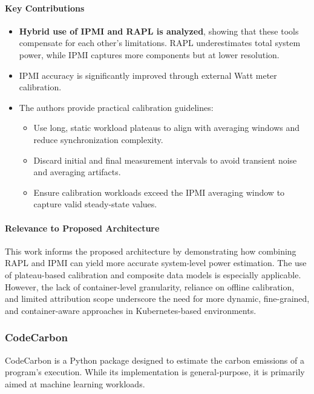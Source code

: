 \paragraph{Key Contributions}
\begin{itemize}
    \item \textbf{Hybrid use of IPMI and RAPL is analyzed}, showing that these tools compensate for each other’s limitations. RAPL underestimates total system power, while IPMI captures more components but at lower resolution.
    \item IPMI accuracy is significantly improved through external Watt meter calibration.
    \item The authors provide practical calibration guidelines:
    \begin{itemize}
        \item Use long, static workload plateaus to align with averaging windows and reduce synchronization complexity.
        \item Discard initial and final measurement intervals to avoid transient noise and averaging artifacts.
        \item Ensure calibration workloads exceed the IPMI averaging window to capture valid steady-state values.
    \end{itemize}
\end{itemize}

\paragraph{Relevance to Proposed Architecture}
This work informs the proposed architecture by demonstrating how combining RAPL and IPMI can yield more accurate system-level power estimation. The use of plateau-based calibration and composite data models is especially applicable. However, the lack of container-level granularity, reliance on offline calibration, and limited attribution scope underscore the need for more dynamic, fine-grained, and container-aware approaches in Kubernetes-based environments.

\subsubsection{CodeCarbon}
CodeCarbon\parencite{codecarbon_2024} is a Python package designed to estimate the carbon emissions of a program’s execution. While its implementation is general-purpose, it is primarily aimed at machine learning workloads.

